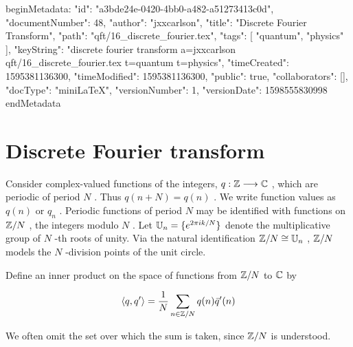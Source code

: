 beginMetadata:
{
    "id": "a3bde24e-0420-4bb0-a482-a51273413c0d",
    "documentNumber": 48,
    "author": "jxxcarlson",
    "title": "Discrete Fourier Transform",
    "path": "qft/16_discrete_fourier.tex",
    "tags": [
        "quantum",
        "physics"
    ],
    "keyString": "discrete fourier transform a=jxxcarlson qft/16_discrete_fourier.tex t=quantum t=physics",
    "timeCreated": 1595381136300,
    "timeModified": 1595381136300,
    "public": true,
    "collaborators": [],
    "docType": "miniLaTeX",
    "versionNumber": 1,
    "versionDate": 1598555830998
}
endMetadata

\setcounter{section}{16}


\begin{mathmacro}
\newcommand{\ZZ}[0]{\mathbb{Z}}
\newcommand{\CC}[0]{\mathbb{C}}
\newcommand{\UU}[0]{\mathbb{U}}
\newcommand{\FFF}[0]{\mathcal{F}}
\newcommand{\WW}[0]{\mathbb{W}}
\newcommand{\bra}[0]{\langle}
\newcommand{\ket}[0]{\rangle}
\newcommand{\set}[1]{\{#1\}}
\end{mathmacro}


 \section{Discrete  Fourier  transform}

 \innertableofcontents

Consider  complex-valued  functions  of  the  integers,   
$q: \ZZ  \longrightarrow \CC $ ,  which  are  periodic  of  period   $N$ .   Thus   $q(n + N) = q(n)$ .   We  write  function  values  as   $q(n)$  or   $q_n$ .  Periodic  functions  of  period   $N$  may  be   identified  with  functions  on   $\ZZ/N$ ,  the  integers  modulo   $N$ .  Let 
  $\UU_n = \set{ e^{2\pi i k/N}}$  denote  the  multiplicative  group  of   $N$  -th  roots  of  unity.  
 Via  the  natural  identification   $\ZZ/N \cong \UU_n $ ,    $\ZZ/N$  models  the   $N$  -division  points   of  the  unit  circle.



Define  an  inner  product  on  the  space  of  functions  from   $\ZZ/N$  to   $\CC$  by



\begin{equation}
\label{fft_ip}
\langle q, q' \rangle
  = 
\frac{1}{N}\sum_{n \in \ZZ/N} q(n)\bar q'(n)
\end{equation}


We  often  omit  the  set  over  which  the  sum  is  taken,  since   $\ZZ/N$  is  understood.



